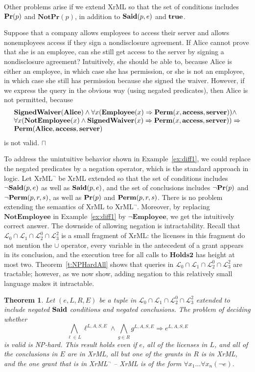 \documentclass{acmtrans2m}
\newtheorem{theorem}{Theorem}[section]
\newcommand{\thm}{\begin{theorem}}
\newcommand{\xam}{\begin{example}}
\newcommand{\ethm}{\end{theorem}}
\newcommand{\exam}{\bbox\end{example}}
\newcommand{\wbox}{\mbox{$\sqcap$\llap{$\sqcup$}}}
\newcommand{\bbox}{\wbox}
\newcommand{\rimp}{\Rightarrow}
\newcommand{\<}{
}
\renewcommand{\>}{\rangle}
\newcommand{\union}{\cup}
\newcommand{\cL}{\mathcal{L}}
\newcommand{\Said}{\mathit{\bf Said}}
\newcommand{\true}{\mathit{\bf{true}}}
\newcommand{\Permitted}{\mathit{\bf Perm}}
\renewcommand{\Pr}{\mathit{\bf Pr}}
\newcommand{\scd}{S}
\newcommand{\cc}{e}
\newcommand{\scc}{E}
\newcommand{\CMetTwo}{\textbf{Holds2}}
\newcommand{\tranwithE}[1]{#1^{L, A, \scd, \scc}}
\newcommand{\pred}[1]{\mathbf{#1}}
\newcommand{\const}[1]{\mathbf{#1}}
\begin{document}
Other problems arise if we extend XrML so that the set of conditions includes $\Pr(p)$ and $\pred{NotPr}(p)$,
in addition to $\Said(p,\cc)$ and $\true$.
\xam\label{ex:diff1}
Suppose that a company allows employees to access their server and allows nonemployees access if they sign a
nondisclosure agreement.  If Alice cannot prove that she is an employee, can she still get access to the
server by signing a nondisclosure agreement?  Intuitively, she should be able to, because Alice is either an
employee, in which case she has permission, or she is not an employee, in which case she still has permission
because she signed the waiver.  However, if we express the query in the obvious way (using negated predicates),
then Alice is not permitted, because
\[
\begin{array}{l}
\pred{SignedWaiver}(\const{Alice})\land
\forall x (\pred{Employee}(x) \rimp\Permitted(x, \const{access}, \const{server}))\land \\
\forall x (\pred{NotEmployee}(x)\land\pred{SignedWaiver}(x) \rimp
\Permitted(x, \const{access}, \const{server}))\rimp\\
\Permitted(\const{Alice}, \const{access}, \const{server})
\end{array}
\]
is not valid.
\exam

To address the unintuitive behavior shown in Example~\ref{ex:diff1}, we could replace the negated predicates
by a negation operator, which is the standard approach in logic.  Let XrML$^\neg$ be XrML extended so that
the set of conditions includes  $\neg\Said(p, \cc)$ as well as $\Said(p,\cc)$, and the set of conclusions
includes $\neg\Pr(p)$ and $\neg\Permitted(p, r, s)$, as well as $\Pr(p)$ and $\Permitted(p,r,s)$.  There is
no problem extending the semantics of XrML to XrML$^\neg$.  Moreover, by replacing $\pred{NotEmployee}$ in
Example~\ref{ex:diff1} by $\neg \pred{Employee}$, we get the intuitively correct answer.  The downside of
allowing negation is intractability.  Recall that $\cL_0\cap\cL_1\cap\cL_2^0\cap\cL_3^2$ is a small fragment
of XrML: the licenses in this fragment do not mention the $\union$ operator, every variable in the antecedent
of a grant appears in its conclusion, and the execution tree for all calls to $\CMetTwo$ has height at most
two.  Theorem~\ref{t:NPHardAll} shows that queries in $\cL_0\cap\cL_1\cap\cL_2^0\cap\cL_3^2$ are tractable;
however, as we now show, adding negation to this relatively small language makes it intractable.
\thm\label{t:ext1}
Let $(\cc, L, R, \scc)$ be a tuple in $\cL_0\cap\cL_1\cap\cL_2^0\cap\cL_3^2$ extended to include negated
$\Said$ conditions and negated conclusions.  The problem of deciding whether
$$
\bigwedge_{\ell\in L} \tranwithE{\ell} \land \bigwedge_{g\in R} \tranwithE{g}\rimp\tranwithE{\cc}
$$
is valid is NP-hard.  This result holds even if $\cc$, all of the licenses in $L$, and all of the
conclusions in $\scc$ are in XrML, all but one of the grants in $R$ is in XrML, and the one grant that is
in XrML$^\neg$ -- XrML is of the form $\forall x_1\ldots\forall x_n(\neg \cc)$.
\ethm
\end{document}
